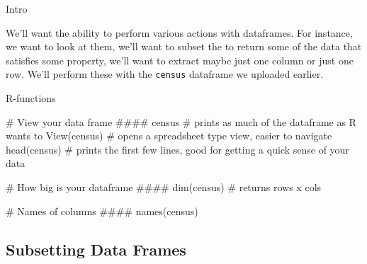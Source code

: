 \documentclass[11pt]{amsart}
\renewcommand{\(}{\left(}
\renewcommand{\)}{\right)}
\newenvironment{notes}{%
	\begin{description}[style=nextline]%
		\setlength{\itemsep}{10pt}%
		\setlength{\parskip}{2pt}%
	}
        {
	\end{description}
}
\begin{document}
\begin{notes}
	
\item[Intro]

  We'll want the ability to perform various actions with dataframes.  For instance, we want to look at them, we'll want to subset the to return some of the data that satisfies some property, we'll want to extract maybe just one column or just one row.  We'll perform these with the \texttt{census} dataframe we uploaded earlier.

  
\item[R-functions]

\begin{rcode}
# View your data frame ####
census # prints as much of the dataframe as R wants to
View(census) # opens a spreadsheet type view, easier to navigate
head(census) # prints the first few lines, good for getting a quick sense of your data

# How big is your dataframe ####
dim(census) # returns rows x cols

# Names of columns ####
names(census)
\end{rcode}

 
\end{notes}

\subsection{Subsetting Data Frames}
\end{document}
